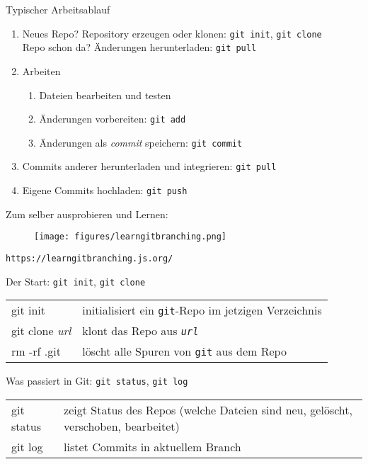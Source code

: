\begin{frame}{Typischer Arbeitsablauf}
  \begin{enumerate}
    \item Neues Repo? Repository erzeugen oder klonen: \hfill\texttt{git init}, \texttt{git clone} \\
      Repo schon da? Änderungen herunterladen: \hfill\texttt{git pull}
    \item Arbeiten
      \begin{enumerate}
        \item Dateien bearbeiten und testen
        \item Änderungen vorbereiten: \hfill\texttt{git add}
        \item Änderungen als \emph{commit} speichern: \hfill\texttt{git commit}
      \end{enumerate}
    \item Commits anderer herunterladen und integrieren: \hfill\texttt{git pull}
    \item Eigene Commits hochladen: \hfill\texttt{git push}
  \end{enumerate}
\end{frame}

\begin{frame}{Zum selber ausprobieren und Lernen:}
  \begin{figure}
    \centering
    \texttt{[image: figures/learngitbranching.png]}
  \end{figure}
  \texttt{https://learngitbranching.js.org/}
\end{frame}

\begin{frame}{Der Start: \texttt{git init}, \texttt{git clone}}
  \begin{tabu}{>{\ttfamily}l X[,L]}
    git init               & initialisiert ein \texttt{git}-Repo im jetzigen Verzeichnis \\
    git clone \textit{url} & klont das Repo aus \texttt{\textit{url}} \\
    rm -rf .git            & löscht alle Spuren von \texttt{git} aus dem Repo
  \end{tabu}
\end{frame}

\begin{frame}{Was passiert in Git: \texttt{git status}, \texttt{git log}}
  \begin{tabu}{>{\ttfamily}l X[,L]}
    git status & zeigt Status des Repos (welche Dateien sind neu, gelöscht, verschoben, bearbeitet) \\
    git log    & listet Commits in aktuellem Branch
  \end{tabu}
\end{frame}

